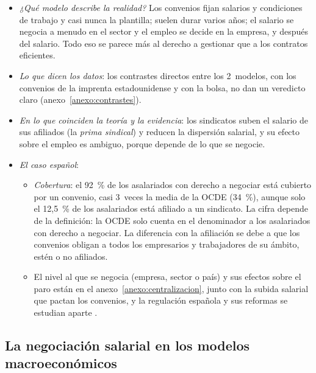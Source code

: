 \documentclass[11pt]{article}
\begin{document}
\begin{itemize}
\item \emph{¿Qué modelo describe la realidad?} Los convenios fijan salarios y condiciones de trabajo y casi nunca la plantilla; suelen durar varios años; el salario se negocia a menudo en el sector y el empleo se decide en la empresa, y después del salario. Todo eso se parece más al derecho a gestionar que a los contratos eficientes\nocite{Cahuc2014Labor}.
\item \emph{Lo que dicen los datos}: los contrastes directos entre los 2~modelos, con los convenios de la imprenta estadounidense y con la bolsa, no dan un veredicto claro (anexo~\ref{anexo:contrastes}).
\item \emph{En lo que coinciden la teoría y la evidencia}: los sindicatos suben el salario de sus afiliados (la \emph{prima sindical}) y reducen la dispersión salarial, y su efecto sobre el empleo es ambiguo, porque depende de lo que se negocie\nocite{Cahuc2014Labor}.
\item \emph{El caso español}:
  \begin{itemize}
  \item \emph{Cobertura}: el 92~\% de los asalariados con derecho a negociar está cubierto por un convenio, casi 3~veces la media de la OCDE (34~\%), aunque solo el 12,5~\% de los asalariados está afiliado a un sindicato\nocite{OCDE2026ICTWSSCobertura,OCDE2026ICTWSSAfiliacion}. La cifra depende de la definición: la OCDE solo cuenta en el denominador a los asalariados con derecho a negociar. La diferencia con la afiliación se debe a que los convenios obligan a todos los empresarios y trabajadores de su ámbito, estén o no afiliados\nocite{BOE2015ET}.
  \item El nivel al que se negocia (empresa, sector o país) y sus efectos sobre el paro están en el anexo~\ref{anexo:centralizacion}, junto con la subida salarial que pactan los convenios, y la regulación española y sus reformas se estudian aparte .
  \end{itemize}
\end{itemize}

\subsection{La negociación salarial en los modelos macroeconómicos}\label{sec:negociacion-macro}
\end{document}
